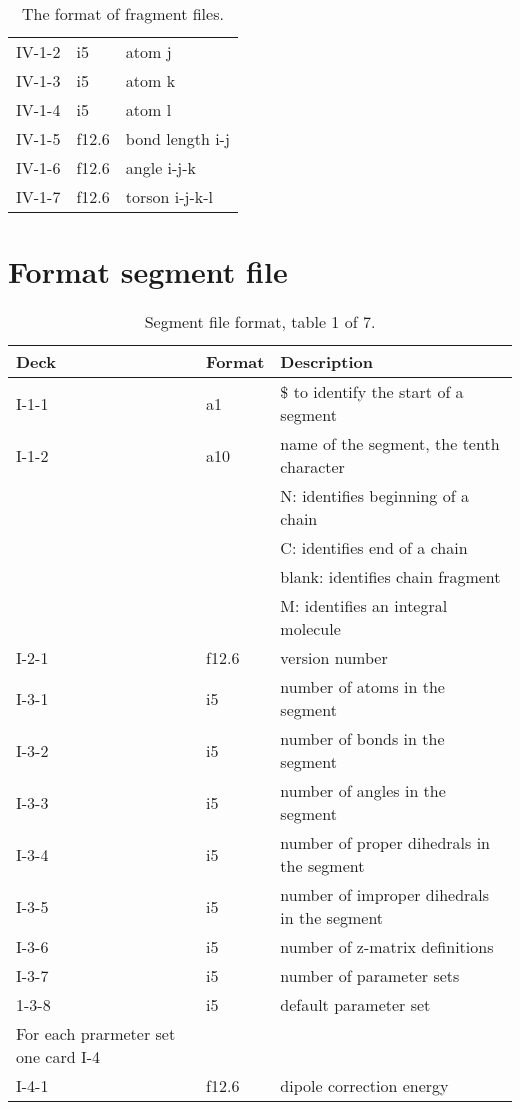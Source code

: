 \begin{table}[h]
\begin{center}
\begin{tabular}{p{15mm}p{12mm}l}
IV-1-2 & i5    & atom j \\
IV-1-3 & i5    & atom k \\
IV-1-4 & i5    & atom l \\
IV-1-5 & f12.6 & bond length i-j\\
IV-1-6 & f12.6 & angle i-j-k\\
IV-1-7 & f12.6 & torson i-j-k-l\\
\hline\hline
\end{tabular}
\caption{The format of fragment files.\label{tbl:nwmdfrg}}
\end{center}
\end{table}

\section {Format segment file}

\begin{table}[h]
\begin{center}
\begin{tabular*}{150mm}{p{15mm}p{12mm}l}
\hline\hline
Deck  & Format & Description \\ \hline
I-1-1 & a1     & \$ to identify the start of a segment \\ %
I-1-2 & a10    & name of the segment, the tenth character\\
      &        & N: identifies beginning of a chain\\
      &        & C: identifies end of a chain\\
      &        & blank: identifies chain fragment\\
      &        & M: identifies an integral molecule\\
\hline
I-2-1 & f12.6  & version number \\
\hline
I-3-1 & i5     & number of atoms in the segment\\
I-3-2 & i5     & number of bonds in the segment\\
I-3-3 & i5     & number of angles in the segment\\
I-3-4 & i5     & number of proper dihedrals in the segment\\
I-3-5 & i5     & number of improper dihedrals in the segment\\
I-3-6 & i5     & number of z-matrix definitions\\
I-3-7 & i5     & number of parameter sets \\
1-3-8 & i5     & default parameter set\\
\hline
For each prarmeter set one card I-4\\
\hline
I-4-1 & f12.6  & dipole correction energy \\
\hline
\end{tabular*}
\caption{Segment file format, table 1 of 7.\label{tbl:nwmdseg1}}
\end{center}
\end{table}

